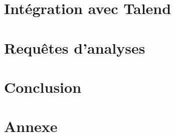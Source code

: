 \documentclass[a4paper,sffamily,12pt]{article}
\begin{document}
		\vspace{0.5cm}
				
	\section{Intégration avec Talend}

		\vspace{0.5cm}
		
		
		
		
		
		
			
	\section{Requêtes d'analyses}

		\vspace{0.5cm}
		
		
		
		
		
																
	\section{Conclusion}

		\vspace{0.5cm}
		
		
		
		
				

		\newpage
	
	\section{Annexe}
					
\end{document}
